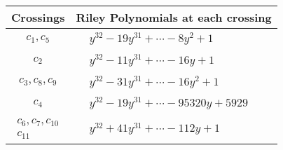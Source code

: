 \documentclass[1p]{elsarticle_modified}
\theoremstyle{definition}
\begin{document}
\begin{tabular}{m{50pt}|m{274pt}}
Crossings & \hspace{64pt}Riley Polynomials at each crossing \\
\hline $$\begin{aligned}c_{1},c_{5}\end{aligned}$$&$\begin{aligned}
&y^{32}-19 y^{31}+\cdots-8 y^2+1
\end{aligned}$\\
\hline $$\begin{aligned}c_{2}\end{aligned}$$&$\begin{aligned}
&y^{32}-11 y^{31}+\cdots-16 y+1
\end{aligned}$\\
\hline $$\begin{aligned}c_{3},c_{8},c_{9}\end{aligned}$$&$\begin{aligned}
&y^{32}-31 y^{31}+\cdots-16 y^2+1
\end{aligned}$\\
\hline $$\begin{aligned}c_{4}\end{aligned}$$&$\begin{aligned}
&y^{32}-19 y^{31}+\cdots-95320 y+5929
\end{aligned}$\\
\hline $$\begin{aligned}c_{6},c_{7},c_{10}\\c_{11}\end{aligned}$$&$\begin{aligned}
&y^{32}+41 y^{31}+\cdots-112 y+1
\end{aligned}$\\
\hline
\end{tabular}
\vskip 2pc
\end{document}
